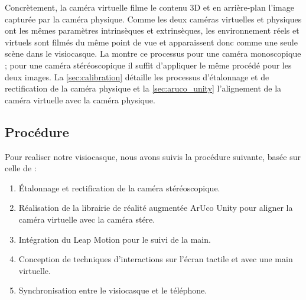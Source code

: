 Concrètement, la caméra virtuelle filme le contenu 3D et en arrière-plan l'image capturée par la caméra physique. Comme les deux caméras virtuelles et physiques ont les mêmes paramètres intrinsèques et extrinsèques, les environnement réels et virtuels sont filmés du même point de vue et apparaissent donc comme une seule scène dans le visiocasque. La  montre ce processus pour une caméra monoscopique ; pour une caméra stéréoscopique il suffit d'appliquer le même procédé pour les deux images. La \autoref{sec:calibration} détaille les processus d'étalonnage et de rectification de la caméra physique et la \autoref{sec:aruco_unity} l'alignement de la caméra virtuelle avec la caméra physique.


\subsection{Procédure}
Pour realiser notre visiocasque, nous avons suivis la procédure suivante, basée sur celle de \cite{Steptoe2013} :
\begin{enumerate}
  \item Étalonnage et rectification de la caméra stéréoscopique.
  \item Réalisation de la librairie de réalité augmentée ArUco Unity pour aligner la caméra virtuelle avec la caméra stére.
  \item Intégration du Leap Motion pour le suivi de la main.
  \item Conception de techniques d'interactions sur l'écran tactile et avec une main virtuelle.
  \item Synchronisation entre le visiocasque et le téléphone.
\end{enumerate}

